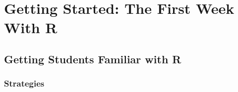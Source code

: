 \chapter{Getting Started: The First Week With R }




\section{Getting Students Familiar with R}

\subsection{Strategies}
